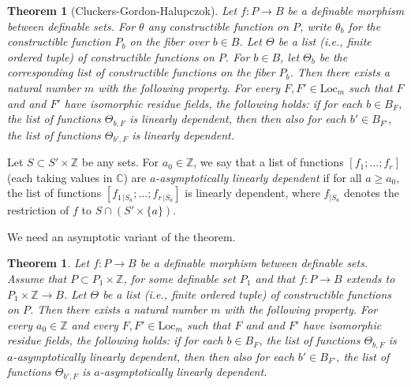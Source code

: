 \documentclass[12pt]{amsart}
\newcommand{\ring}[1]{{\mathbb #1}}
\newcommand{\Loc}{\mathrm{Loc}}
\theoremstyle{plain}
\newtheorem{theorem}[thm]{Theorem}
\theoremstyle{definition}
\begin{document}
\begin{theorem}[Cluckers-Gordon-Halupczok]\label{thm:cgh}
Let $f:P\to B$ be a definable morphism between
  definable sets.  For $\theta$ any constructible function on $P$, write
  $\theta_{b}$ for the constructible function $P_b$ on the fiber over $b\in
  B$.  Let $\Theta$ be a list (i.e., finite ordered tuple) of constructible
  functions on $P$. For $b\in B$, let $\Theta_b$ be the corresponding list
  of constructible functions on the fiber $P_b$.  Then there exists a
  natural number $m$ with the following property.  For every $F,F' \in
  \Loc_{m}$ such that $F$ and and $F'$ have isomorphic residue
  fields, the following holds: if for each $b\in B_F$, the list of
  functions $\Theta_{b,F}$ is linearly dependent, then then also for each
  $b'\in B_{F'}$, the list of functions $\Theta_{b',F}$ is linearly
  dependent.
\end{theorem}

Let $S \subset S'\times\ring{Z}$ be any sets.  For $a_0\in\ring{Z}$,
we say that a list of functions $[f_1;\ldots;f_r]$ (each taking values
in $\ring{C}$) are {\it $a$-asymptotically linearly dependent} if for all $a\ge
a_0$, the list of functions $[f_{1\,|S_a};\ldots;f_{r\,|S_a}]$ is
linearly dependent, where $f_{|S_a}$ denotes the restriction of $f$ to
$S\cap (S'\times\{a\})$.

We need an asymptotic variant of the theorem.


\begin{theorem}\label{thm:cgh-asymp}
Let $f:P\to B$ be a definable morphism between
  definable sets.   Assume that $P\subset P_1\times\ring{Z}$, for some
  definable set $P_1$ and that $f:P\to B$ extends to
  $P_1\times\ring{Z}\to B$.  Let $\Theta$ be a list (i.e., finite ordered tuple) of constructible
  functions on $P$.   Then there exists a
  natural number $m$ with the following property.  For every
  $a_0\in\ring{Z}$ and every $F,F' \in
  \Loc_{m}$ such that $F$ and and $F'$ have isomorphic residue
  fields, the following holds: if for each $b\in B_F$, the list of
  functions $\Theta_{b,F}$ is $a$-asymptotically linearly dependent, then then also for each
  $b'\in B_{F'}$, the list of functions $\Theta_{b',F}$ is $a$-asymptotically linearly
  dependent.
\end{theorem}
\end{document}
